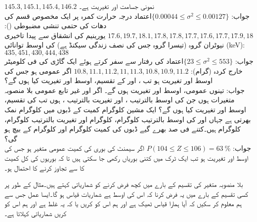\quad
$145.3, 145.1, 145.4,146.2$
\quad
نمونی جسامت  اور تغیریت  ہے۔\\
جواب:\quad
$\text{اعتماد} \{0.00044\le \sigma^2\le 0.00127\}$
\quad
درجہ حرارت کمرہ پر ایک مخصوص قسم کی دھات کی حتمی تنشی مضبوطی ():
$17.6,19.7,18.1,17.8,17.8,17.7,17.6,17.7,17.9,18$
\quad
یورینیم  کی انشقاق سے پیدا تاخیری نیوٹران  گروہ (تیسرا گروہ جس کی نصف زندگی  سیکنڈ ہے) کی اوسط توانائی (\si{\kilo\electronvolt}):
$435,451,430,444,438$\\
جواب:\quad
$\text{اعتماد} \{23\le\sigma^2\le553\}$
\quad
{} کی رفتار سے سفر کرتے ہوئے ایک گاڑی کی فی کلومیٹر خارج کردہ
  (گرام): $10.8,11.1,11.2,11,11.3,10.8,10.9,11.2$  
\quad
اگر  عمومی ہو جس کی اوسط  اور تغیریت  ہو تب ،  اور  کے تقسیم، اوسط اور تغیریت کیا ہوں گے؟\\
جواب:\quad
تینوں عمومی، اوسط  اور تغیریت  ہوں گے۔
\quad
اگر  اور  غیر تابع عمومی بلا منصوبہ متغیرات ہوں جن کی اوسط بالترتیب ،  اور تغیریت  بالترتیب ،   ہوں تب  کی تقسیم، اوسط اور تغیریت کیا ہوں گے؟
\quad
ایک مشین  کلوگرام کمیت کے ڈبوں میں  کلوگرام نمک بھرتی ہے جہاں  اور  کی اوسط بالترتیب  کلوگرام،  کلوگرام اور تغیریت بالترتیب  کلوگرام،  کلوگرام ہیں۔کتنے فی صد بھرے گیے  ڈبوں کی کمیت  کلوگرام اور  کلوگرام کے بیچ ہو گی؟\\
جواب:\quad
$P(104\le Z\le 106)=\SI{63}{\percent}$
\quad
اگر سیمنٹ کی بوری کی کمیت  عمومی متغیر ہو جس کی اوسط  اور تغیریت  ہو تب ایک ٹرک میں کتنی بوریاں رکھی جا سکتی ہیں تا کہ بوریوں کی  کل کمیت کا  سے تجاوز کرنے کا احتمال  ہو۔

بلا منصوبہ متغیر کی تقسیم کے بارے میں کچھ فرض کرنے کو شماریاتی  کہتے ہیں۔مثال کے طور پر کسی تقسیم کے بارے میں یہ فرض کرنا کہ اس کی اوسط  ہے شماریات قیاس ہو گا۔ایسا عمل  جس سے ہم معلوم کر سکیں کہ آیا ہمارا قیاس  ٹھیک ہے اور ہم اس کو  کریں یا کہ یہ غلط ہے اور ہم اس کو  کریں شماریاتی  کہلاتا ہے۔

